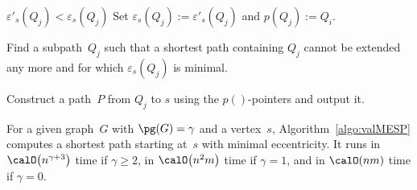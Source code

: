 \begin{algorithm}
{{{            \If
            {
                $\varepsilon'_s(Q_j) < \varepsilon_s(Q_j)$
                \label{line:comareEpsilon}
            }
            {
                Set $\varepsilon_s(Q_j) := \varepsilon'_s(Q_j)$ and $p(Q_j) := Q_i$.
                \label{line:setP}
            }
        }
    }
}

Find a subpath~$Q_j$ such that a shortest path containing $Q_j$ cannot be extended any more and for which $\varepsilon_s(Q_j)$ is minimal.
\label{line:findMinQj}

Construct a path~$P$ from $Q_j$ to $s$ using the $p()$-pointers and output it.
\label{line:constructP}
\end{algorithm}

\begin{theorem}
For a given graph~\( G \) with \( \pg(G) = \gamma \) and a vertex~\( s \), Algorithm~\ref{algo:valMESP} computes a shortest path starting at~\( s \) with minimal eccentricity.
It runs in \( \calO \big( n^{\gamma + 3} \big) \) time if \( \gamma \geq 2 \), in \( \calO \big( n^2 m \big) \) time if \( \gamma = 1 \), and in \( \calO(nm) \) time if \( \gamma = 0 \).
\end{theorem}

